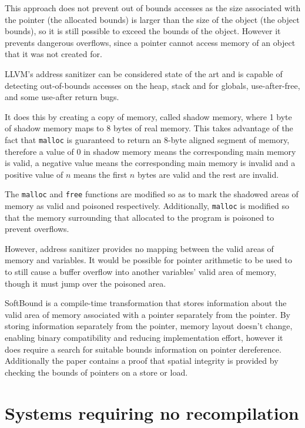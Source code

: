 This approach does not prevent out of bounds accesses as the size associated with the pointer (the allocated bounds) is larger than the size of the object (the object bounds), so it is still possible to exceed the bounds of the object.
However it prevents dangerous overflows, since a pointer cannot access memory of an object that it was not created for.

LLVM's address sanitizer \cite{llvmAddrSan, llvmAddrSanAlgo} can be considered state of the art and  is capable of detecting out-of-bounds accesses on the heap, stack and for globals, use-after-free, and some use-after return bugs.

It does this by creating a copy of memory, called shadow memory, where 1 byte of shadow memory maps to 8 bytes of real memory.
This takes advantage of the fact that \verb!malloc! is guaranteed to return an 8-byte aligned segment of memory, therefore a value of 0 in shadow memory means the corresponding main memory is valid, a negative value means the corresponding main memory is invalid and a positive value of $n$ means the first $n$ bytes are valid and the rest are invalid.

The \verb!malloc! and \verb!free! functions are modified so as to mark the shadowed areas of memory as valid and poisoned respectively.
Additionally, \verb!malloc! is modified so that the memory surrounding that allocated to the program is poisoned to prevent overflows.

However, address sanitizer provides no mapping between the valid areas of memory and variables.
It would be possible for pointer arithmetic to be used to to still cause a buffer overflow into another variables' valid area of memory, though it must jump over the poisoned area.

SoftBound \cite{nagarakatte2009softbound} is a compile-time transformation that stores information about the valid area of memory associated with a pointer separately from the pointer.
By storing information separately from the pointer, memory layout doesn't change, enabling binary compatibility and reducing implementation effort, however it does require a search for suitable bounds information on pointer dereference.
Additionally the paper contains a proof that spatial integrity is provided by checking the bounds of pointers on a store or load.

\section{Systems requiring no recompilation}


